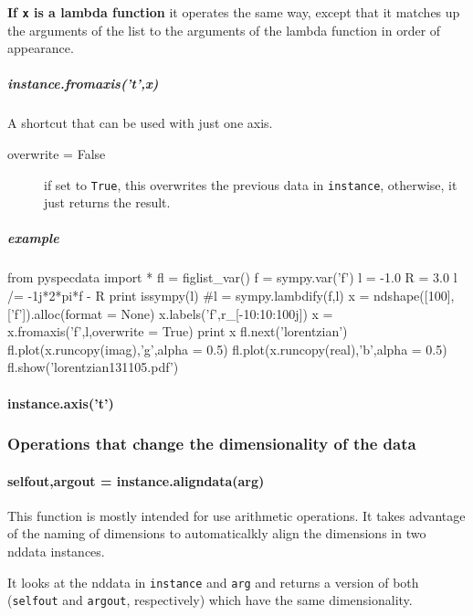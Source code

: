 \textbf{If \texttt{x} is a lambda function} it operates the same way, except that it matches up the arguments of the list to the arguments of the lambda function in order of appearance.

\subparagraph{instance.fromaxis('t',x)}
A shortcut that can be used with just one axis.

\begin{mykwargs}
    \begin{description}
        \item[overwrite = False] 
            if set to \texttt{True}, this overwrites the previous data in \texttt{instance}, otherwise, it just returns the result.
    \end{description}
\end{mykwargs}

\subparagraph{example}

\begin{python}
from pyspecdata import *
fl = figlist_var()
f = sympy.var('f')
l = -1.0
R = 3.0
l /= -1j*2*pi*f - R
print issympy(l)
#l = sympy.lambdify(f,l)
x = ndshape([100],['f']).alloc(format = None)
x.labels('f',r_[-10:10:100j])
x = x.fromaxis('f',l,overwrite = True)
print x
fl.next('lorentzian')
fl.plot(x.runcopy(imag),'g',alpha = 0.5)
fl.plot(x.runcopy(real),'b',alpha = 0.5)
fl.show('lorentzian131105.pdf')
\end{python}

\paragraph{instance.axis('t')}
\subsubsection{Operations that change the dimensionality of the data}
\paragraph{selfout,argout = instance.aligndata(arg)}\label{codelabel:aligndata}
This function is mostly intended for use arithmetic operations.
It takes advantage of the naming of dimensions to automaticalkly
    align the dimensions in two nddata instances.

It looks at the nddata in \texttt{instance} and \texttt{arg} and
    returns a version of both
    (\texttt{selfout} and \texttt{argout}, respectively)
    which have the same dimensionality.

